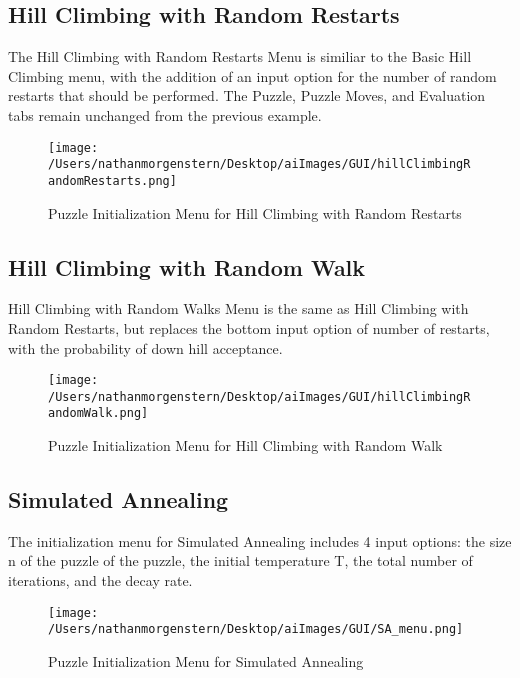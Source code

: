 \documentclass{report}
\begin{document}
\subsection{Hill Climbing with Random Restarts}
The Hill Climbing with Random Restarts Menu is similiar to the Basic Hill Climbing menu, with the addition of an input option for the number of random restarts that should be performed. The Puzzle, Puzzle Moves, and Evaluation tabs remain unchanged from the previous example.

	\begin{figure}[H]
	\centering
	\texttt{[image: /Users/nathanmorgenstern/Desktop/aiImages/GUI/hillClimbingRandomRestarts.png]}
	\caption{Puzzle Initialization Menu for Hill Climbing with Random Restarts}
	\label{fig: Puzzle Initialization Menu for Hill Climbing with Random Restarts}
	\end{figure}
	
\newpage	
\subsection{Hill Climbing with Random Walk}
Hill Climbing with Random Walks Menu is the same as Hill Climbing with Random Restarts, but replaces the bottom input option of number of restarts, with the probability of down hill acceptance.

	\begin{figure}[H]
	\centering
	\texttt{[image: /Users/nathanmorgenstern/Desktop/aiImages/GUI/hillClimbingRandomWalk.png]}
	\caption{Puzzle Initialization Menu for Hill Climbing with Random Walk}
	\label{fig: Puzzle Initialization Menu for Hill Climbing with Random Walk}
	\end{figure}
	
\newpage	
\subsection{Simulated Annealing}
The initialization menu for Simulated Annealing includes 4 input options: the size n of the puzzle of the puzzle, the initial temperature T, the total number of iterations, and the decay rate.
 
	\begin{figure}[H]
	\centering
	\texttt{[image: /Users/nathanmorgenstern/Desktop/aiImages/GUI/SA\_menu.png]}
	\caption{Puzzle Initialization Menu for Simulated Annealing}
	\label{fig: Puzzle Initialization Menu for Simulated Annealing}
	\end{figure}
	
\end{document}

